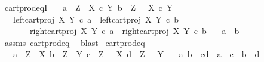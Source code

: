 \begin{isabellebody}
\endisatagproof
{\isafoldproof}%
%
\isadelimproof
\isanewline
%
\endisadelimproof
\isanewline
{}\isamarkupfalse%
\ cart{\isacharunderscore}{\kern0pt}prod{\isacharunderscore}{\kern0pt}eqI{\isacharcolon}{\kern0pt}\isanewline
\ \ \ {\isachardoublequoteopen}a\ {\isacharcolon}{\kern0pt}\ Z\ {\isasymrightarrow}\ X\ {\isasymtimes}\isactrlsub c\ Y{\isachardoublequoteclose}\ {\isachardoublequoteopen}b\ {\isacharcolon}{\kern0pt}\ Z\ {\isasymrightarrow}\ \ X\ {\isasymtimes}\isactrlsub c\ Y{\isachardoublequoteclose}\isanewline
\ \ \ {\isachardoublequoteopen}{\isacharparenleft}{\kern0pt}left{\isacharunderscore}{\kern0pt}cart{\isacharunderscore}{\kern0pt}proj\ X\ Y\ {\isasymcirc}\isactrlsub c\ a\ {\isacharequal}{\kern0pt}\ left{\isacharunderscore}{\kern0pt}cart{\isacharunderscore}{\kern0pt}proj\ X\ Y\ {\isasymcirc}\isactrlsub c\ b\ \isanewline
\ \ \ \ \ \ {\isasymand}\ right{\isacharunderscore}{\kern0pt}cart{\isacharunderscore}{\kern0pt}proj\ X\ Y\ {\isasymcirc}\isactrlsub c\ a\ {\isacharequal}{\kern0pt}\ right{\isacharunderscore}{\kern0pt}cart{\isacharunderscore}{\kern0pt}proj\ X\ Y\ {\isasymcirc}\isactrlsub c\ b{\isacharparenright}{\kern0pt}{\isachardoublequoteclose}\isanewline
\ \ \ {\isachardoublequoteopen}a\ {\isacharequal}{\kern0pt}\ b{\isachardoublequoteclose}\isanewline
%
\isadelimproof
\ \ %
\endisadelimproof
%
\isatagproof
{}\isamarkupfalse%
\ assms\ cart{\isacharunderscore}{\kern0pt}prod{\isacharunderscore}{\kern0pt}eq\ \isamarkupfalse%
\ blast%
\endisatagproof
{\isafoldproof}%
%
\isadelimproof
\isanewline
%
\endisadelimproof
\isanewline
{}\isamarkupfalse%
\ cart{\isacharunderscore}{\kern0pt}prod{\isacharunderscore}{\kern0pt}eq{}{\isacharcolon}{\kern0pt}\isanewline
\ \ \ {\isachardoublequoteopen}a\ {\isacharcolon}{\kern0pt}\ Z\ {\isasymrightarrow}\ X{\isachardoublequoteclose}\ {\isachardoublequoteopen}b\ {\isacharcolon}{\kern0pt}\ Z\ {\isasymrightarrow}\ Y{\isachardoublequoteclose}\ {\isachardoublequoteopen}c\ {\isacharcolon}{\kern0pt}\ Z\ {\isasymrightarrow}\ \ X{\isachardoublequoteclose}\ {\isachardoublequoteopen}d\ {\isacharcolon}{\kern0pt}\ Z\ {\isasymrightarrow}\ \ Y{\isachardoublequoteclose}\isanewline
\ \ \ {\isachardoublequoteopen}{\isasymlangle}a{\isacharcomma}{\kern0pt}\ b{\isasymrangle}\ {\isacharequal}{\kern0pt}\ {\isasymlangle}c{\isacharcomma}{\kern0pt}d{\isasymrangle}\ {\isasymlongleftrightarrow}\ {\isacharparenleft}{\kern0pt}a\ {\isacharequal}{\kern0pt}\ c\ {\isasymand}\ b\ {\isacharequal}{\kern0pt}\ d{\isacharparenright}{\kern0pt}{\isachardoublequoteclose}\isanewline

\end{isabellebody}
